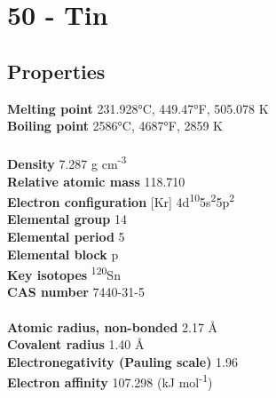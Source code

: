 \section{50 - Tin}
\label{sec:elem-tin}
\subsection{Properties}
\textbf{Melting point} 231.928°C, 449.47°F, 505.078 K\\
\textbf{Boiling point} 2586°C, 4687°F, 2859 K\\
\\
\textbf{Density} 7.287 g cm\textsuperscript{-3}\\
\textbf{Relative atomic mass} 118.710\\
\textbf{Electron configuration} [Kr] 4d\textsuperscript{10}5s\textsuperscript{2}5p\textsuperscript{2}\\
\textbf{Elemental group} 14\\
\textbf{Elemental period} 5\\
\textbf{Elemental block} p\\
\textbf{Key isotopes} \textsuperscript{120}Sn\\
\textbf{CAS number} 7440-31-5\\
\\
\textbf{Atomic radius, non-bonded} 2.17 Å\\
\textbf{Covalent radius} 1.40 Å\\
\textbf{Electronegativity (Pauling scale)} 1.96\\
\textbf{Electron affinity} 107.298 (kJ mol\textsuperscript{-1})\\